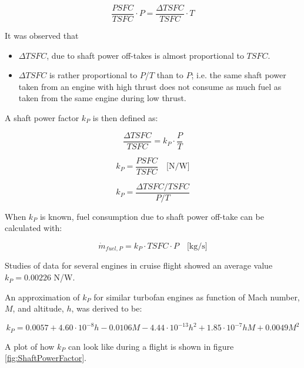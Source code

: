 \documentclass[english]{kththesis}
\begin{document}
$$\frac{PSFC}{TSFC} \cdot P = \frac{\Delta TSFC}{TSFC} \cdot T$$

It was observed that

\begin{itemize}
  \item $\Delta TSFC$, due to shaft power off-takes is almost proportional to $TSFC$.
  \item $\Delta TSFC$ is rather proportional to $P$/$T$ than to $P$; i.e. the same shaft power taken from an engine with high thrust does not consume as much fuel as taken from the same engine during low thrust.
\end{itemize}

A shaft power factor $k_P$ is then defined as:

$$\frac{\Delta TSFC}{TSFC} = k_P \cdot \frac{P}{T}$$

$$k_P = \frac{PSFC}{TSFC} \quad \textrm{[N/W]}$$

$$k_P = \frac{\Delta TSFC / TSFC}{P / T}$$

When $k_P$ is known, fuel consumption due to shaft power off-take can be calculated with:

\begin{equation}
\dot{m}_{fuel,P} = k_P \cdot TSFC \cdot P \quad \textrm{[kg/s]}
\end{equation}

Studies of data for several engines in cruise flight showed an average value $k_P = 0.00226$ N/W.

An approximation of $k_P$ for similar turbofan engines as function of Mach number, $M$, and altitude, $h$, was derived to be:

\begin{equation}
\label{eq:kp}
k_P = 0.0057 + 4.60 \cdot 10^{-8} h - 0.0106 M - 4.44 \cdot 10^{-13} h^2 + 1.85 \cdot 10^{-7} h M + 0.0049 M^2
\end{equation}

A plot of how $k_P$ can look like during a flight is shown in figure \ref{fig:ShaftPowerFactor}.
\end{document}
